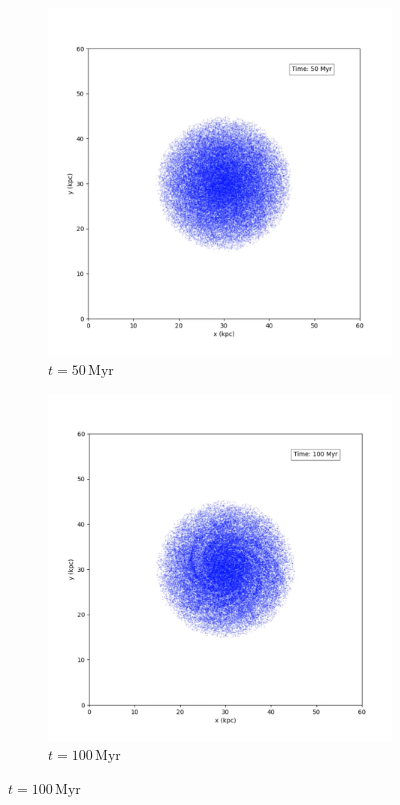 \begin{figure}[htp]
    \centering
    \begin{subfigure}[b]{0.45\textwidth}
        \centering
        \includegraphics[width=\textwidth]{img/p3m/50myr.png}
        \caption{$t=50\,\text{Myr}$}
        \label{fig:spiral-galaxy-evolution-p3m-sub1}
    \end{subfigure}
    \hfill
    \begin{subfigure}[b]{0.45\textwidth}
        \centering
        \includegraphics[width=\textwidth]{img/p3m/100myr.png}
        \caption{$t=100\,\text{Myr}$}
        \label{fig:spiral-galaxy-evolution-p3m-sub2}
    \end{subfigure}


\end{figure}
